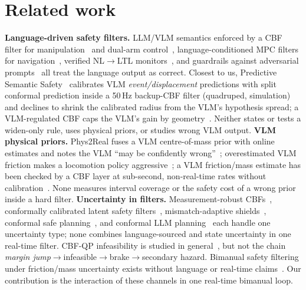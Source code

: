 \documentclass[10pt,twocolumn,letterpaper]{article}
\begin{document}
\section{Related work}\label{sec:related}
\textbf{Language-driven safety filters.} LLM/VLM semantics enforced by a CBF filter for manipulation~\cite{brunke2025} and dual-arm
control~\cite{gfvla}, language-conditioned MPC filters for navigation~\cite{feng2025}, verified NL$\to$LTL monitors~\cite{safetychip}, and
guardrails against adversarial prompts~\cite{roboguard} all treat the language output as correct. Closest to us, Predictive Semantic
Safety~\cite{pss} calibrates VLM \emph{event/displacement} predictions with split conformal prediction inside a 50\,Hz backup-CBF filter
(quadruped, simulation) and declines to shrink the calibrated radius from the VLM's hypothesis spread; a VLM-regulated CBF caps the VLM's
gain by geometry~\cite{alphaadj}. Neither states or tests a widen-only rule, uses physical priors, or studies wrong VLM output.
\textbf{VLM physical priors.} Phys2Real fuses a VLM centre-of-mass prior with online estimates and notes the VLM ``may be confidently
wrong''~\cite{phys2real}; overestimated VLM friction makes a locomotion policy aggressive~\cite{peng2025}; a VLM friction/mass estimate has
been checked by a CBF layer at sub-second, non-real-time rates without calibration~\cite{physician}. None measures interval coverage or the
safety cost of a wrong prior inside a hard filter. \textbf{Uncertainty in filters.} Measurement-robust CBFs~\cite{dean2020},
conformally calibrated latent safety filters~\cite{seo2025}, mismatch-adaptive shields~\cite{lu2025}, conformal safe
planning~\cite{lindemann2023}, and conformal LLM planning~\cite{knowno} each handle one uncertainty type; none combines language-sourced and
state uncertainty in one real-time filter. CBF-QP infeasibility is studied in general~\cite{xiao2023,rousseas2025,hsu2024}, but not the
chain \emph{margin jump}$\to$infeasible$\to$brake$\to$secondary hazard. Bimanual safety filtering under friction/mass uncertainty exists
without language or real-time claims~\cite{johansson2025}. Our contribution is the interaction of these channels in one real-time
bimanual loop.
\end{document}
